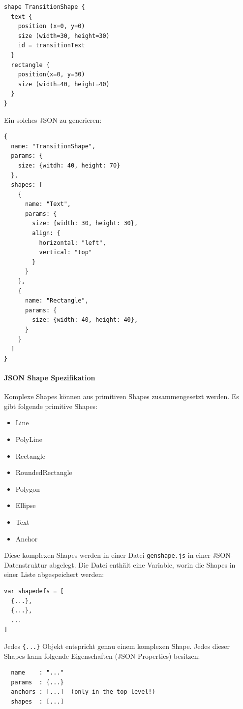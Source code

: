 \begin{verbatim}
shape TransitionShape {
  text {
    position (x=0, y=0)
    size (width=30, height=30)
    id = transitionText
  }
  rectangle {
    position(x=0, y=30)
    size (width=40, height=40)  
  }
}
\end{verbatim}

\noindent Ein solches JSON zu generieren:

\begin{verbatim}
{
  name: "TransitionShape",
  params: {
    size: {witdh: 40, height: 70}
  },
  shapes: [
    {
      name: "Text",
      params: {
        size: {width: 30, height: 30},
        align: {
          horizontal: "left",
          vertical: "top"
        }
      }
    },
    {
      name: "Rectangle",
      params: {
        size: {width: 40, height: 40},
      }
    }
  ]
}
\end{verbatim}

\paragraph{JSON Shape Spezifikation}
Komplexe Shapes können aus primitiven Shapes zusammengesetzt werden.
Es gibt folgende primitive Shapes:

\begin{itemize}
  \item Line
  \item PolyLine
  \item Rectangle
  \item RoundedRectangle
  \item Polygon
  \item Ellipse
  \item Text
  \item Anchor
\end{itemize}

\noindent Diese komplexen Shapes werden in einer Datei {\tt genshape.js} in einer
JSON-Datenstruktur abgelegt. Die Datei enthält eine Variable, worin die
Shapes in einer Liste abgespeichert werden:

\begin{verbatim}
var shapedefs = [
  {...},
  {...},
  ...
]
\end{verbatim}

\noindent Jedes \verb|{...}| Objekt entspricht genau einem komplexen Shape.
Jedes dieser Shapes kann folgende Eigenschaften (JSON Properties) besitzen:

\begin{verbatim}
  name    : "..."
  params  : {...}
  anchors : [...]  (only in the top level!)
  shapes  : [...]
\end{verbatim}

